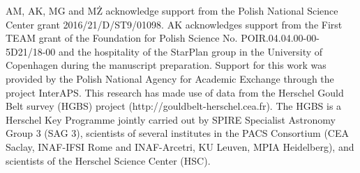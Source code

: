 \documentclass{aa}
\begin{document}
\begin{acknowledgements} AM, AK, MG and MŻ acknowledge support from the Polish National Science
 Center grant 2016/21/D/ST9/01098. AK acknowledges support from the First TEAM grant of 
 the Foundation for Polish Science No. POIR.04.04.00-00-5D21/18-00 and the hospitality 
 of the StarPlan group in the University of Copenhagen during the manuscript preparation.
Support for this work was provided by the Polish National Agency for Academic Exchange through the project InterAPS.
This research has made use of data from the Herschel Gould Belt survey (HGBS) project
(http://gouldbelt-herschel.cea.fr). The HGBS is a Herschel Key Programme jointly carried out by
SPIRE Specialist Astronomy Group 3 (SAG 3), scientists of several institutes in the PACS Consortium
(CEA Saclay, INAF-IFSI Rome and INAF-Arcetri, KU Leuven, MPIA Heidelberg), and scientists of the
Herschel Science Center (HSC). 
\end{acknowledgements}


\end{document}
